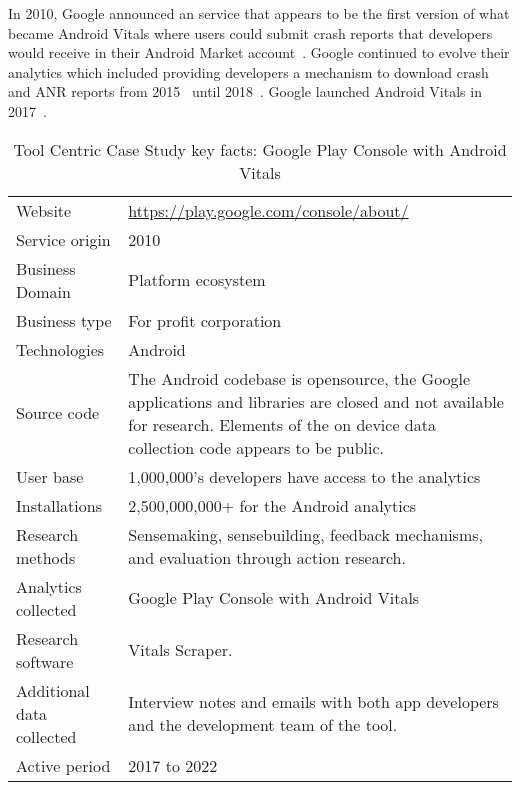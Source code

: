 In 2010, Google announced an service that appears to be the first version of what became Android Vitals where users could submit crash reports that developers would receive in their Android Market account~\citep{androiddevelopersblog2010_android_error_crash_reports}. Google continued to evolve their analytics which included providing developers a mechanism to download crash and ANR reports from 2015~\citep{androiddevelopers2015_integrate_play_data_into_your_workflow_with_data_exports} until 2018~\citep{google_play_download_and_export_monthly_reports}. Google launched Android Vitals in 2017~\citep{androiddevelopersblog2017_android_vitals_increase_engagement_etc}.

{\renewcommand{\arraystretch}{0.8}%
\begin{table}[htbp!]
    \centering
    \small
    \setlength{\tabcolsep}{1pt}
    \begin{tabular}{lp{9cm}}
       \toprule
       Website &\url{https://play.google.com/console/about/} \\
       Service origin & 2010\footnotemark \\
       Business Domain & Platform ecosystem \\
       Business type & For profit corporation \\
       Technologies  & Android \\
       Source code  & The Android codebase is opensource, the Google applications and libraries are closed and not available for research. Elements of the on device data collection code appears to be public.\\
       \midrule
       User base & 1,000,000's developers have access to the analytics \\
       Installations & 2,500,000,000+ for the Android analytics~\citep{androiddevelopersblog2019_unlock_your_creativity_2_5_billion} \\ 
       \midrule
       Research methods &Sensemaking, sensebuilding, feedback mechanisms, and evaluation through action research. \\
       Analytics collected &Google Play Console with Android Vitals \\
       Research software & Vitals Scraper. \\
       Additional data collected &Interview notes and emails with both app developers and the development team of the tool. \\
       Active period & 2017 to 2022 \\
       \bottomrule
    \end{tabular}
    \caption{Tool Centric Case Study key facts: Google Play Console with Android Vitals}
    \label{tab:google_play_console_with_android_vitals_anaytics_overview}
\end{table}
}

